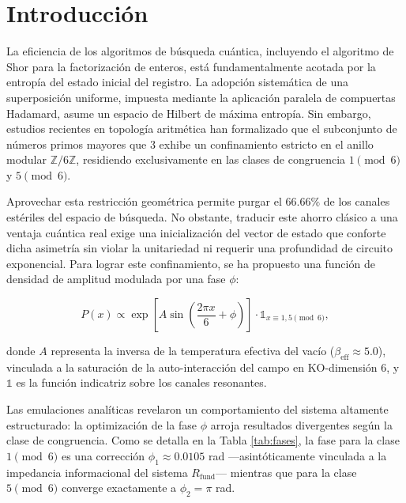 \documentclass[12pt,a4paper]{article}
\theoremstyle{plain}
\theoremstyle{definition}
\theoremstyle{remark}
\begin{document}
\tableofcontents
\newpage

\section{Introducción}

La eficiencia de los algoritmos de búsqueda cuántica, incluyendo el algoritmo de Shor para la factorización de enteros, está fundamentalmente acotada por la entropía del estado inicial del registro. La adopción sistemática de una superposición uniforme, impuesta mediante la aplicación paralela de compuertas Hadamard, asume un espacio de Hilbert de máxima entropía. Sin embargo, estudios recientes en topología aritmética \cite{PeinadorGenesis, PeinadorSpectrum, PeinadorDSP} han formalizado que el subconjunto de números primos mayores que $3$ exhibe un confinamiento estricto en el anillo modular $\mathbb{Z}/6\mathbb{Z}$, residiendo exclusivamente en las clases de congruencia $1 \pmod 6$ y $5 \pmod 6$.

Aprovechar esta restricción geométrica permite purgar el $66.66\%$ de los canales estériles del espacio de búsqueda. No obstante, traducir este ahorro clásico a una ventaja cuántica real exige una inicialización del vector de estado que conforte dicha asimetría sin violar la unitariedad ni requerir una profundidad de circuito exponencial. Para lograr este confinamiento, se ha propuesto una función de densidad de amplitud modulada por una fase $\phi$:

\begin{equation}
P(x) \propto \exp\left[A \sin\left(\frac{2\pi x}{6} + \phi\right)\right] \cdot \mathds{1}_{x\equiv 1,5 \pmod{6}},
\label{eq:amplitud}
\end{equation}

donde $A$ representa la inversa de la temperatura efectiva del vacío ($\beta_{\text{eff}} \approx 5.0$), vinculada a la saturación de la auto-interacción del campo en KO-dimensión 6, y $\mathds{1}$ es la función indicatriz sobre los canales resonantes.

Las emulaciones analíticas revelaron un comportamiento del sistema altamente estructurado: la optimización de la fase $\phi$ arroja resultados divergentes según la clase de congruencia. Como se detalla en la Tabla \ref{tab:fases}, la fase para la clase $1 \pmod 6$ es una corrección $\phi_1 \approx 0.0105$ rad —asintóticamente vinculada a la impedancia informacional del sistema $R_{\text{fund}}$— mientras que para la clase $5 \pmod 6$ converge exactamente a $\phi_2 = \pi$ rad. 
\end{document}
